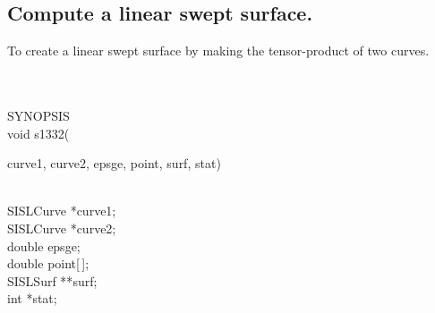 \subsection{Compute a linear swept surface.}
\begin{minipg1}
  To create a linear swept surface by making the tensor-product of two curves.
\end{minipg1} \\ \\
SYNOPSIS\\
        \>void s1332(\begin{minipg3}
                                {\fov curve1}, {\fov curve2}, {\fov epsge}, {\fov point}, {\fov surf}, {\fov stat})
                \end{minipg3}\\[0.3ex]
                \>\>    SISLCurve       \>      *{\fov curve1};\\
                \>\>    SISLCurve       \>      *{\fov curve2};\\
                \>\>    double  \>      {\fov epsge};\\
                \>\>    double  \>      {\fov point}[\,];\\
                \>\>    SISLSurf        \>      **{\fov surf};\\
                \>\>    int     \>      *{\fov stat};\\

